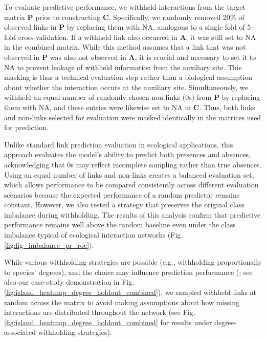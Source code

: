 \documentclass[oneside, a4paper, onecolumn, 11pt]{article}
\newcommand{\revtag}[1]{\textcolor{softcoral}{[#1]}}
\begin{document}
To evaluate predictive performance, we withheld interactions from the target matrix $\mathbf{P}$ prior to constructing $\mathbf{C}$. Specifically, we randomly removed 20\% of observed links in $\mathbf{P}$ by replacing them with NA, analogous to a single fold of 5-fold cross-validation.
If a withheld link also occurred in $\mathbf{A}$, it was still set to NA in the combined matrix. While this method assumes that a link that was not observed in $\mathbf{P}$ was also not observed in $\mathbf{A}$, it is crucial and necessary to set it to NA to prevent leakage of withheld information from the auxiliary site. This masking is thus a technical evaluation step rather than a biological assumption about whether the interaction occurs at the auxiliary site.
Simultaneously, we withheld an equal number of randomly chosen non-links (0s) from $\mathbf{P}$ by replacing them with NA, and these entries were likewise set to NA in $\mathbf{C}$. Thus, both links and non-links selected for evaluation were masked identically in the matrices used for prediction. %

Unlike standard link prediction evaluation in ecological applications, this approach evaluates the model’s ability to predict both presences and absences, acknowledging that 0s may reflect incomplete sampling rather than true absences. Using an equal number of links and non-links creates a balanced evaluation set, which allows performance to be compared consistently across different evaluation scenarios because the expected performance of a random predictor remains constant. However, we also tested a strategy that preserves the original class imbalance during withholding. The results of this analysis confirm that predictive performance remains well above the random baseline even under the class imbalance typical of ecological interaction networks (Fig. \ref{fig:fig_imbalance_pr_roc}). %

While various withholding strategies are possible (e.g., withholding proportionally to species’ degrees), and the choice may influence prediction performance (\cite{He2024-jj}; see also our case-study demonstration in Fig. \ref{fig:island_heatmap_degree_holdout_combined}), we sampled withheld links at random across the matrix to avoid making assumptions about how missing interactions are distributed throughout the network (see Fig. \ref{fig:island_heatmap_degree_holdout_combined} for results under degree-associated withholding strategies).%
\end{document}
